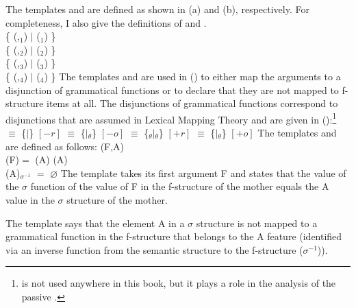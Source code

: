 The templates  and  are defined as shown in (a) and
(b), respectively. For completeness, I also give the definitions of  and .
\eal
\ex {} \tempeq\\
      \{ (,$_1$) $\mid$
      ($_1$) \}
\ex {} \tempeq\\
      \{ (,$_2$) $\mid$
      ($_2$) \}
\ex {} \tempeq\\
      \{ (,$_3$) $\mid$
      ($_3$) \}
\ex {} \tempeq\\
      \{ (,$_4$) $\mid$
      ($_4$) \}
\zl
The templates  and  are used in () to either map the arguments to a
disjunction of grammatical functions or to declare that they are not mapped to f-structure items at
all. The disjunctions of grammatical functions correspond to disjunctions that are assumed in
Lexical Mapping Theory and are given in ():\footnote{%
   is not used anywhere in this book, but it plays a role in the analysis of the passive
  \parencites[]{Findlay2016a-u}[]{AGT2014a}.%
}
\eal
\ex {} $\equiv$
      \{$\mid$\}
      \hfill $[-r]$
\ex {} $\equiv$
      \{$\mid$$_\theta$\}
      \hfill $[-o]$
\ex {} $\equiv$
      \{$_\theta$$\mid$$_\theta$\}
      \hfill $[+r]$
\ex {} $\equiv$ 
      \{$\mid$$_\theta$\}
      \hfill $[+o]$
\zl
The templates  and  are defined as follows:
\eal
\ex {}(F,A) \tempeq\\  (\up F)\sig $=$  (\upsig A) 
\ex {}(A) \tempeq\\  (\upsig A)$_{{\sigma}^{-1}}$ $=$ $\varnothing$  
\zl
The template  takes its first argument F and states that the value of the $\sigma$
function of the value of F in the f-structure of the mother equals the A value in the $\sigma$ structure
of the mother.

The template  says that the element A in a $\sigma$ structure is not mapped to a
grammatical function in the f-structure that belongs to the A feature (identified via an inverse
function from the semantic structure to the f-structure ($\sigma^{-1}$)). 

